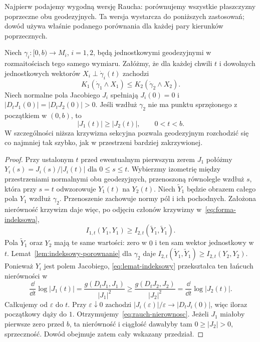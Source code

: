Najpierw podajemy wygodną wersję Raucha:
porównujemy wszystkie płaszczyzny poprzeczne
obu geodezyjnych. Ta wersja wystarcza do poniższych
zastosowań; dowód używa właśnie podanego porównania
dla każdej pary kierunków poprzecznych.

\begin{twierdzenie}
\label{thm:rauch-porownanie}
Niech $\gamma_i:[0,b)\to M_i$, $i=1,2$,
będą jednostkowymi geodezyjnymi w rozmaitościach
tego samego wymiaru. Załóżmy, że dla każdej
chwili $t$ i dowolnych jednostkowych wektorów
$X_i\perp\dot\gamma_i(t)$ zachodzi
\[
 K_1(\dot\gamma_1\wedge X_1)
 \leq K_2(\dot\gamma_2\wedge X_2).
\]
Niech normalne pola Jacobiego $J_i$ spełniają
$J_i(0)=0$ i
$|D_tJ_1(0)|=|D_tJ_2(0)|>0$.
Jeśli wzdłuż $\gamma_2$ nie ma punktu
sprzężonego z początkiem w $(0,b)$, to
\begin{equation}\label{eq:rauch-nierownosc}
 |J_1(t)|\geq |J_2(t)|,
 \qquad 0<t<b.
\end{equation}
W szczególności niższa krzywizna sekcyjna
pozwala geodezyjnym rozchodzić się co najmniej
tak szybko, jak w przestrzeni bardziej zakrzywionej.
\end{twierdzenie}
\begin{proof}
Przy ustalonym $t$ przed ewentualnym pierwszym
zerem $J_1$ połóżmy
$Y_i(s)=J_i(s)/|J_i(t)|$ dla $0\leq s\leq t$.
Wybierzmy izometrię między przestrzeniami
normalnymi obu geodezyjnych, przenoszoną
równolegle wzdłuż $s$, która przy $s=t$
odwzorowuje $Y_1(t)$ na $Y_2(t)$.
Niech $\widetilde Y_1$ będzie obrazem całego
pola $Y_1$ wzdłuż $\gamma_2$. Przenoszenie
zachowuje normy pól i ich pochodnych.
Założona nierówność krzywizn daje więc,
po odjęciu członów krzywizny w~\eqref{eq:forma-indeksowa},
\[
 I_{1,t}(Y_1,Y_1)
 \geq I_{2,t}(\widetilde Y_1,\widetilde Y_1).
\]
Pola $\widetilde Y_1$ oraz $Y_2$ mają te
same wartości: zero w $0$ i ten sam wektor
jednostkowy w $t$. Lemat~\ref{lem:indeksowy-porownanie}
dla $\gamma_2$ daje
$I_{2,t}(\widetilde Y_1,\widetilde Y_1)
\geq I_{2,t}(Y_2,Y_2)$.
Ponieważ $Y_i$ jest polem Jacobiego,
\eqref{eq:lemat-indeksowy} przekształca ten
łańcuch nierówności w
\[
 \frac{\dd}{\dd t}\log|J_1(t)|
 =\frac{g(D_tJ_1,J_1)}{|J_1|^2}
 \geq\frac{g(D_tJ_2,J_2)}{|J_2|^2}
 =\frac{\dd}{\dd t}\log|J_2(t)|.
\]
Całkujemy od $\varepsilon$ do $t$.
Przy $\varepsilon\downarrow0$ zachodzi
$|J_i(\varepsilon)|/\varepsilon
\to|D_tJ_i(0)|$, więc iloraz początkowy
dąży do $1$. Otrzymujemy~\eqref{eq:rauch-nierownosc}.
Jeżeli $J_1$ miałoby pierwsze zero przed $b$,
ta nierówność i ciągłość dawałyby tam
$0\geq|J_2|>0$, sprzeczność. Dowód obejmuje
zatem cały wskazany przedział.
\end{proof}

